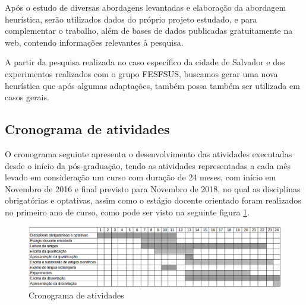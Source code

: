 Após o estudo de diversas abordagens levantadas e elaboração da abordagem heurística, serão utilizados dados do próprio projeto estudado, e para complementar o trabalho, além de bases de dados publicadas gratuitamente na web, contendo informações relevantes à pesquisa.

A partir da pesquisa realizada no caso específico da cidade de Salvador e dos experimentos realizados com o grupo \ac{FESFSUS}, buscamos gerar uma nova heurística que após algumas adaptações, também possa também ser utilizada em casos gerais.

\subsection{Cronograma de atividades}

O cronograma seguinte apresenta o desenvolvimento das atividades executadas desde o início da pós-graduação, tendo as atividades representadas a cada mês levado em consideração um curso com duração de 24 meses, com início em Novembro de 2016 e final previsto para Novembro de 2018, no qual as disciplinas obrigatórias e optativas, assim como o estágio docente orientado foram realizados no primeiro ano de curso, como pode ser visto na seguinte figura \ref{cronograma_atividade}.

\begin{figure}[H]
\includegraphics[width=1 \textwidth]{cronograma_atividades.png}
\begin{center}
\caption{Cronograma de atividades \label{cronograma_atividade}}
\end{center}
\end{figure}

